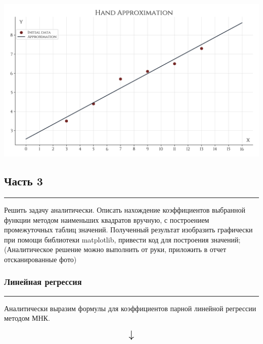\documentclass[a4paper, 14pt]{extarticle}
\begin{document}
\vfill\newpage

\begin{center}
    \includegraphics[width=1\textwidth, height=0.5\textheight, keepaspectratio]{Plot_Hand_Approximation} \\
\end{center}

\subsection*{{Часть 3}}\vspace{-20pt}\rule{\linewidth}{0.1mm}

Решить задачу аналитически. Описать нахождение коэффициентов выбранной функции методом 
наименьших квадратов вручную, с построением промежуточных таблиц значений. Полученный 
результат изобразить графически при помощи библиотеки matplotlib, привести код для построения 
значений; (Аналитическое решение можно выполнить от руки, приложить в отчет отсканированные фото)

\subsubsection*{{Линейная регрессия}}\vspace{-20pt}\rule{\linewidth}{0.1mm}

Аналитически выразим формулы для коэффициентов парной линейной регрессии методом МНК.

\vfill

\begin{equation*}
    \scalebox{1.5}{
        $\downarrow$
    }
\end{equation*}
\end{document}
